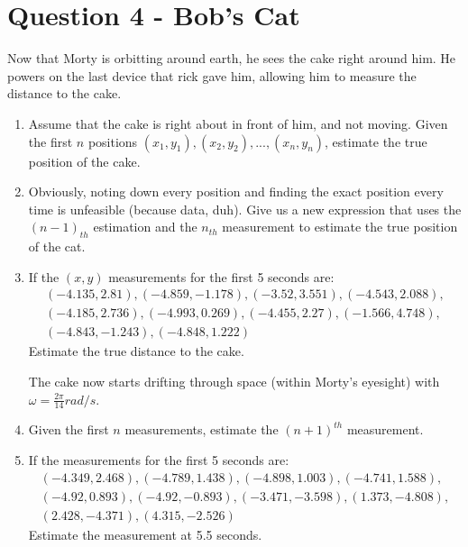 \documentclass[a4paper, 12pt]{exam}
\begin{document}
\section*{Question 4 - Bob's Cat}
Now that Morty is orbitting around earth, he sees the cake right around him. He powers on the last device that rick gave him, allowing him to measure the distance to the cake. 
	\begin{enumerate}[label = (\alph*)]
		\item Assume that the cake is right about in front of him, and not moving. Given the first $n$ positions ${(x_1, y_1), (x_2, y_2), ... , (x_n, y_n)}$, estimate the true position of the cake.
		\item Obviously, noting down every position and finding the exact position every time is unfeasible (because data, duh). Give us a new expression that uses the $(n-1)_{th}$ estimation and the $n_{th}$ measurement to estimate the true position of the cat.
		\item If the $(x,y)$ measurements for the first 5 seconds are:
		\begin{align*}
			(-4.135, 2.81), (-4.859, -1.178), (-3.52, 3.551), (-4.543, 2.088), \\
			(-4.185, 2.736), (-4.993, 0.269), (-4.455, 2.27), (-1.566, 4.748), \\
			(-4.843, -1.243), (-4.848, 1.222)
		\end{align*}
		Estimate the true distance to the cake.
		
		The cake now starts drifting through space (within Morty's eyesight) with $\omega = \frac{2\pi}{14} rad/s$. 
		
		\item Given the first $n$ measurements, estimate the $(n+1)^{th}$ measurement.
		
		\item If the measurements for the first 5 seconds are:
		\begin{align*}
			(-4.349, 2.468), (-4.789, 1.438), (-4.898, 1.003), (-4.741, 1.588), \\
			(-4.92, 0.893),	(-4.92, -0.893), (-3.471, -3.598), (1.373, -4.808), \\
			(2.428, -4.371), (4.315, -2.526)
		\end{align*}
		Estimate the measurement at 5.5 seconds.
	\end{enumerate}

\end{document}

